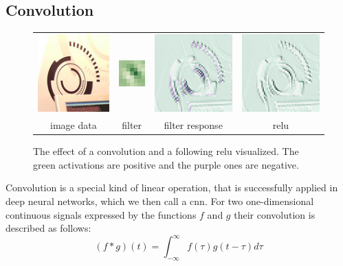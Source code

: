 \subsection{Convolution} %
\label{sub:conepts:nn:conv}
\begin{figure}
    \centering
    \begin{tabulary}{\linewidth}{CCCC}
        \includegraphics[height=3cm]{figures/activation_data} &
        \vspace{-1.8cm}\includegraphics[height=1cm]{figures/activation_filter} &
        \includegraphics[height=3cm]{figures/activation_response} &
        \includegraphics[height=3cm]{figures/activation_relu} \\
        image data & filter & filter response & \gls{relu} \\
    \end{tabulary}
    \caption{The effect of a convolution and a following \gls{relu} visualized. The green activations are positive and the purple ones are negative.}
\end{figure}
Convolution is a special kind of linear operation, that is successfully applied in deep neural networks, which we then call a \acrfull{cnn}. For two one-dimensional continuous signals expressed by the functions $f$ and $g$ their convolution is described as follows:
\begin{equation}
    (f * g)(t) = \int_{-\infty}^\infty f(\tau)g(t - \tau)d\tau
\end{equation}
